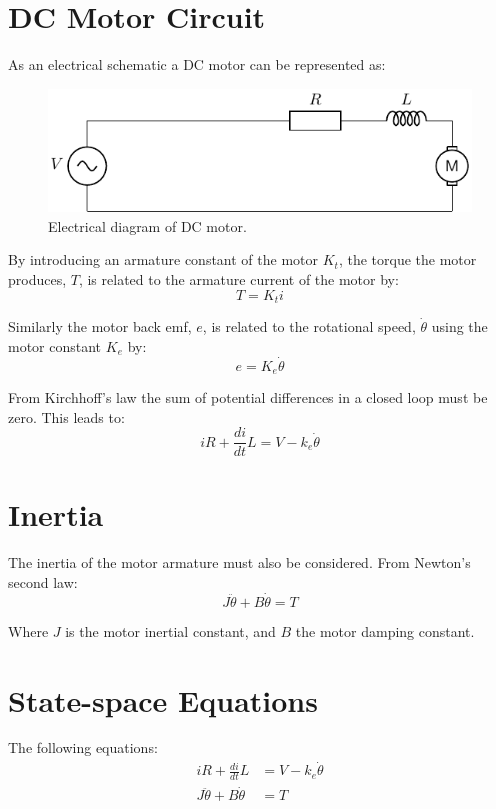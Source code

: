 \documentclass[11pt]{article}
\begin{document}
\section{DC Motor Circuit}
As an electrical schematic a DC motor can be represented as:
\begin{figure}[h]
  \centering
  \includegraphics{motor_schematic/motor_schematic.pdf}
  \caption{Electrical diagram of DC motor.}
\end{figure}

By introducing an armature constant of the motor $K_t$, the torque the motor produces, $T$, is related to the armature current of the motor by:
\begin{equation}
  T = K_t i
\end{equation}

Similarly the motor back emf, $e$, is related to the rotational speed, $\dot{\theta}$ using the motor constant $K_e$ by:
\begin{equation}
  e = K_e \dot{\theta}
\end{equation}

From Kirchhoff's law the sum of potential differences in a closed loop must be zero. This leads to:
\begin{equation}
  iR + \frac{di}{dt}L = V - k_e\dot{\theta}
\end{equation}

\section{Inertia}
The inertia of the motor armature must also be considered.
From Newton's second law:
\begin{equation}
  J\ddot{\theta} + B\dot{\theta} = T
\end{equation}

Where $J$ is the motor inertial constant, and $B$ the motor damping constant.

\section{State-space Equations}
The following equations:
\begin{subequations}
  \begin{align}
    iR + \frac{di}{dt}L &= V - k_e\dot{\theta} \\
    J\ddot{\theta} + B\dot{\theta} &= T
  \end{align}
\end{subequations}
\end{document}
